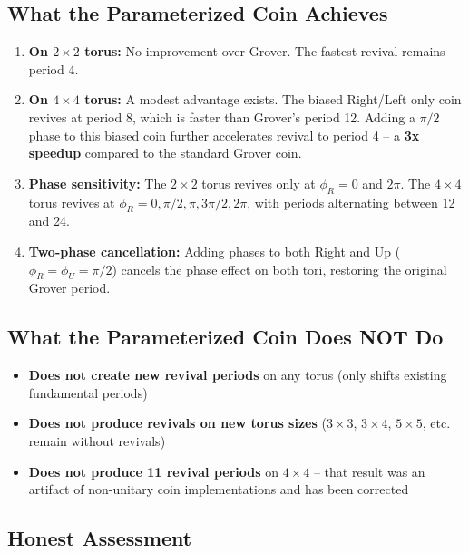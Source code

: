 \documentclass[12pt]{article}
\begin{document}
\subsection{What the Parameterized Coin Achieves}

\begin{enumerate}
    \item \textbf{On $2 \times 2$ torus:} No improvement over Grover. The fastest revival remains period 4.
    
    \item \textbf{On $4 \times 4$ torus:} A modest advantage exists. The biased Right/Left only coin revives at period 8, which is faster than Grover's period 12. Adding a $\pi/2$ phase to this biased coin further accelerates revival to period 4 – a \textbf{3x speedup} compared to the standard Grover coin.
    
    \item \textbf{Phase sensitivity:} The $2 \times 2$ torus revives only at $\phi_R = 0$ and $2\pi$. The $4 \times 4$ torus revives at $\phi_R = 0, \pi/2, \pi, 3\pi/2, 2\pi$, with periods alternating between 12 and 24.
    
    \item \textbf{Two-phase cancellation:} Adding phases to both Right and Up ($\phi_R = \phi_U = \pi/2$) cancels the phase effect on both tori, restoring the original Grover period.
\end{enumerate}

\subsection{What the Parameterized Coin Does NOT Do}

\begin{itemize}
    \item \textbf{Does not create new revival periods} on any torus (only shifts existing fundamental periods)
    \item \textbf{Does not produce revivals on new torus sizes} ($3 \times 3$, $3 \times 4$, $5 \times 5$, etc. remain without revivals)
    \item \textbf{Does not produce 11 revival periods} on $4 \times 4$ – that result was an artifact of non-unitary coin implementations and has been corrected
\end{itemize}

\subsection{Honest Assessment}
\end{document}
